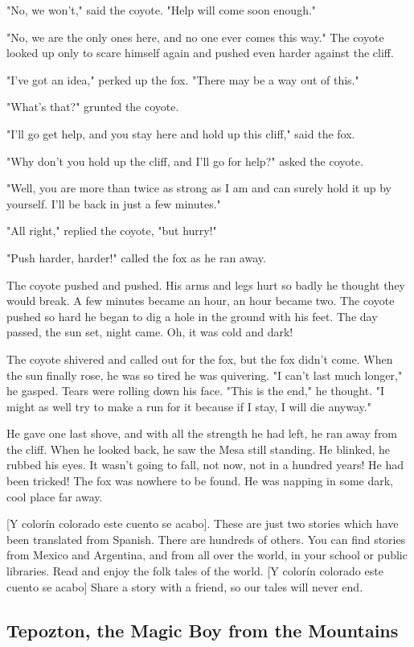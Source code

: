 "No, we won't," said the coyote. "Help will come soon enough."

"No, we are the only ones here, and no one ever comes this way." The coyote looked up only to scare himself again and pushed even harder against the cliff.

"I've got an idea," perked up the fox. "There may be a way out of this."

"What's that?" grunted the coyote.

"I'll go get help, and you stay here and hold up this cliff," said the fox.

"Why don't you hold up the cliff, and I'll go for help?" asked the coyote.

"Well, you are more than twice as strong as I am and can surely hold it up by yourself. I'll be back in just a few minutes."

"All right," replied the coyote, "but hurry!"

"Push harder, harder!" called the fox as he ran away.

The coyote pushed and pushed. His arms and legs hurt so badly he thought they would break. A few minutes became an hour, an hour became two. The coyote pushed so hard he began to dig a hole in the ground with his feet. The day passed, the sun set, night came. Oh, it was cold and dark!

The coyote shivered and called out for the fox, but the fox didn't come. When the sun finally rose, he was so tired he was quivering. "I can't last much longer," he gasped. Tears were rolling down his face. "This is the end," he thought. "I might as well try to make a run for it because if I stay, I will die anyway."

He gave one last shove, and with all the strength he had left, he ran away from the cliff. When he looked back, he saw the Mesa still standing. He blinked, he rubbed his eyes. It wasn't going to fall, not now, not in a hundred years! He had been tricked! The fox was nowhere to be found. He was napping in some dark, cool place far away.

    [Y colorín colorado este cuento se acabo]. These are just two stories which have been translated from Spanish. There are hundreds of others. You can find stories from Mexico and Argentina, and from all over the world, in your school or public libraries. Read and enjoy the folk tales of the world. [Y colorín colorado este cuento se acabo] Share a story with a friend, so our tales will never end.

\subsection{Tepozton, the Magic Boy from the Mountains}

